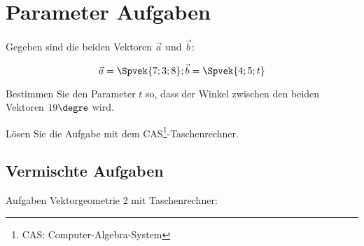 \section{Parameter Aufgaben}

Gegeben sind die beiden Vektoren $\vec{a}$ und $\vec{b}$:

$$\vec{a} = \Spvek{7;3;8}; \vec{b} = \Spvek{4;5;t}$$

Bestimmen Sie den Parameter $t$ so, dass der Winkel zwischen den
beiden Vektoren $19\degre$ wird.

Lösen Sie die Aufgabe mit dem CAS\footnote{CAS: Computer-Algebra-System}-Taschenrechner.



\newpage
\subsection{Vermischte Aufgaben}
Aufgaben Vektorgeometrie 2 mit Taschenrechner:



